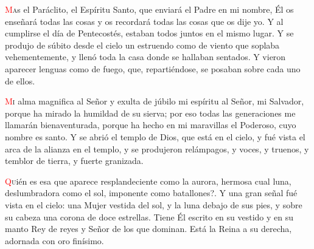 \documentclass[10pt,twoside]{book}
\begin{document}
\vspace{0.5em}



\vspace{1.5em}

\noindent{}
\lettrine[lines=2]{\textcolor{red}{M}}as el Paráclito, el Espíritu Santo, que enviará el Padre en mi nombre, Él os enseñará todas las cosas y os recordará todas las cosas que os dije yo.
Y al cumplirse el día de Pentecostés, estaban todos juntos en el mismo lugar. Y se produjo de súbito desde el cielo un estruendo como de viento que soplaba vehementemente,
y llenó toda la casa donde se hallaban sentados. Y vieron aparecer lenguas como de fuego, que, repartiéndose, se posaban sobre cada uno de ellos.

\vspace{0.5em}



\vspace{1.5em}

\noindent{}
\lettrine[lines=2]{\textcolor{red}{M}}i alma magnifica al Señor y exulta de júbilo mi espíritu al Señor, mi Salvador, porque ha mirado la humildad de su sierva;
por eso todas las generaciones me llamarán bienaventurada, porque ha hecho en mi maravillas el Poderoso, cuyo nombre es santo. Y se abrió el templo de Dios, que está en el cielo,
y fué vista el arca de la alianza en el templo, y se produjeron relámpagos, y voces, y truenos, y temblor de tierra, y fuerte granizada.

\vspace{0.5em}



\vspace{1.5em}

\noindent{}
\lettrine[lines=2, ante={?`}]{\textcolor{red}{Q}}uién es esa que aparece resplandeciente como la aurora, hermosa cual luna, deslumbradora como el sol, imponente como batallones?.
Y una gran señal fué vista en el cielo: una Mujer vestida del sol, y la luna debajo de sus  pies, y sobre su cabeza una corona de doce estrellas.
Tiene Él escrito en su vestido y en su manto Rey de reyes y Señor de los que dominan. Está la Reina a su derecha, adornada con oro finísimo.
\end{document}
